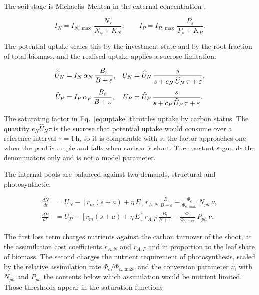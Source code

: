 The soil stage is Michaelis--Menten in the external concentration
\citep{Epstein1952,Tinker2000},

\begin{equation}
I_N = I_{N,\max}\,\frac{N_s}{N_s + K_N},
\qquad
I_P = I_{P,\max}\,\frac{P_s}{P_s + K_P} .
\label{eq:soil_uptake}
\end{equation}

The potential uptake scales this by the investment state and by the root
fraction of total biomass, and the realised uptake applies a sucrose limitation:

\begin{align}
\widehat{U}_N &= I_N\,\alpha_N\,\frac{B_r}{B + \varepsilon},
&
U_N &= \widehat{U}_N\,
\frac{s}{s + c_N\,\widehat{U}_N\,\tau + \varepsilon},
\label{eq:uptake}\\[3pt]
\widehat{U}_P &= I_P\,\alpha_P\,\frac{B_r}{B + \varepsilon},
&
U_P &= \widehat{U}_P\,
\frac{s}{s + c_P\,\widehat{U}_P\,\tau + \varepsilon} .
\notag
\end{align}

The saturating factor in Eq.~\eqref{eq:uptake} throttles uptake by carbon status.
The quantity $c_N \widehat{U}_N \tau$ is the sucrose that potential uptake would
consume over a reference interval $\tau = 1\,\mathrm{h}$, so it is comparable with
$s$: the factor approaches one when the pool is ample and falls when carbon is
short. The constant $\varepsilon$ guards the denominators only and is not a model
parameter.

The internal pools are balanced against two demands, structural and
photosynthetic:

\begin{align}
\frac{dN}{dt} &= U_N
- \left[r_m\left(s+a\right) + \eta\,E\right] r_{A,N}\,\frac{B_l}{B+\varepsilon}
- \frac{\Phi_c}{\Phi_{c,\max}}\,N_{ph}\,\nu ,
\label{eq:dN}\\[3pt]
\frac{dP}{dt} &= U_P
- \left[r_m\left(s+a\right) + \eta\,E\right] r_{A,P}\,\frac{B_l}{B+\varepsilon}
- \frac{\Phi_c}{\Phi_{c,\max}}\,P_{ph}\,\nu .
\label{eq:dP}
\end{align}

The first loss term charges nutrients against the carbon turnover of the shoot, at
the assimilation cost coefficients $r_{A,N}$ and $r_{A,P}$ and in proportion to
the leaf share of biomass. The second charges the nutrient requirement of
photosynthesis, scaled by the relative assimilation rate $\Phi_c/\Phi_{c,\max}$
and the conversion parameter $\nu$, with $N_{ph}$ and $P_{ph}$ the contents below
which assimilation would be nutrient limited. Those thresholds appear in the
saturation functions

